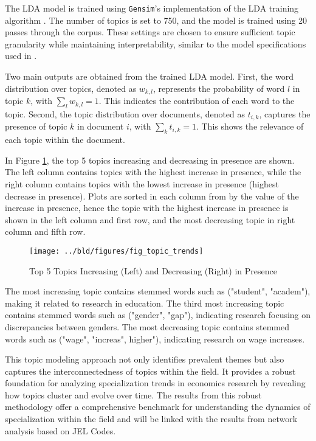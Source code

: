 \documentclass[11pt, a4paper, leqno]{article}
\begin{document}
The LDA model is trained using \texttt{Gensim}'s implementation of the LDA training algorithm \citep{rehurek2010}.
The number of topics is set to 750, and the model is trained using 20 passes through the corpus.
These settings are chosen to ensure sufficient topic granularity while maintaining interpretability, similar to the model specifications used in \citet{galiani2023a}.

Two main outputs are obtained from the trained LDA model.
First, the word distribution over topics, denoted as $w_{k,l}$, represents the probability of word $l$ in topic $k$, with $\sum_l w_{k,l} = 1$.
This indicates the contribution of each word to the topic.
Second, the topic distribution over documents, denoted as $t_{i,k}$, captures the presence of topic $k$ in document $i$, with $\sum_k t_{i,k} = 1$.
This shows the relevance of each topic within the document.

In Figure \ref{fig:top5_increasing_decreasing_topics}, the top 5 topics increasing and decreasing in presence are shown.
The left column contains topics with the highest increase in presence, while the right column contains topics with the lowest increase in presence (highest decrease in presence).
Plots are sorted in each column from by the value of the increase in presence, hence the topic with the highest increase in presence is shown in the left column and first row, and the most decreasing topic in right column and fifth row.

\begin{figure}[H]
    \centering
    \texttt{[image: ../bld/figures/fig\_topic\_trends]}
    \caption{Top 5 Topics Increasing (Left) and Decreasing (Right) in Presence}
    \label{fig:top5_increasing_decreasing_topics}
\end{figure}

The most increasing topic contains stemmed words such as ("student", "academ"), making it related to research in education.
The third most increasing topic contains stemmed words such as ("gender", "gap"), indicating research focusing on discrepancies between genders.
The most decreasing topic contains stemmed words such as ("wage", "increas", higher"), indicating research on wage increases.

This topic modeling approach not only identifies prevalent themes but also captures the interconnectedness of topics within the field.
It provides a robust foundation for analyzing specialization trends in economics research by revealing how topics cluster and evolve over time.
The results from this robust methodology offer a comprehensive benchmark for understanding the dynamics of specialization within the field and will be linked with the results from network analysis based on JEL Codes.
\end{document}
